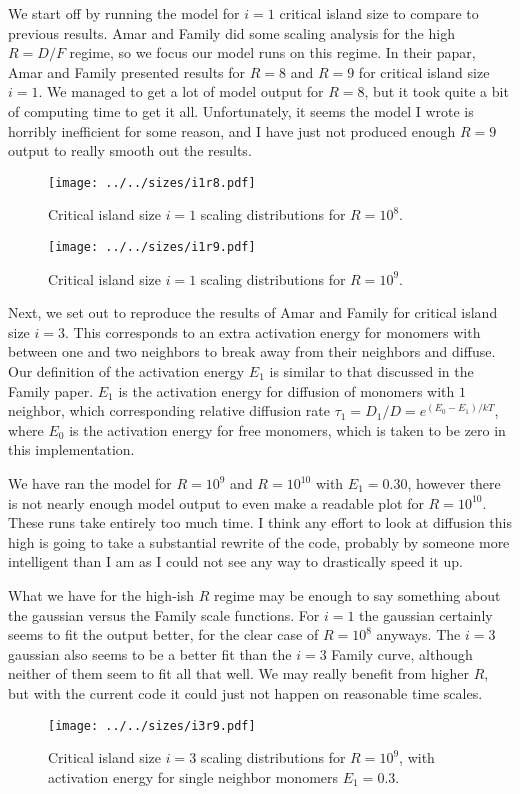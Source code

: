 \documentclass[12pt]{article}
\begin{document}
We start off by running the model for $i = 1$ critical island size to compare to previous results. Amar and Family did some scaling analysis for the high $R = D/F$ regime, so we focus our model runs on this regime. In their papar, Amar and Family presented results for $R = 8$ and $R = 9$ for critical island size $i = 1$. We managed to get a lot of model output for $R = 8$, but it took quite a bit of computing time to get it all. Unfortunately, it seems the model I wrote is horribly inefficient for some reason, and I have just not produced enough $R = 9$ output to really smooth out the results.


\begin{figure}
\begin{center}
\texttt{[image: ../../sizes/i1r8.pdf]} \\
\end{center}
\caption{Critical island size $i = 1$ scaling distributions for $R = 10^8$.}
\end{figure}

\begin{figure}
\begin{center}
\texttt{[image: ../../sizes/i1r9.pdf]}
\end{center}
\caption{Critical island size $i = 1$ scaling distributions for $R = 10^9$.}
\end{figure}

Next, we set out to reproduce the results of Amar and Family for critical island size $i = 3$. This corresponds to an extra activation energy for monomers with between one and two neighbors to break away from their neighbors and diffuse. Our definition of the activation energy $E_1$ is similar to that discussed in the Family paper. $E_1$ is the activation energy for diffusion of monomers with $1$ neighbor, which corresponding relative diffusion rate $\tau_1 = D_1/D = e^{(E_0 - E_1)/kT}$, where $E_0$ is the activation energy for free monomers, which is taken to be zero in this implementation.

We have ran the model for $R = 10^9$ and $R = 10^{10}$ with $E_1 = 0.30$, however there is not nearly enough model output to even make a readable plot for $R = 10^{10}$. These runs take entirely too much time. I think any effort to look at diffusion this high is going to take a substantial rewrite of the code, probably by someone more intelligent than I am as I could not see any way to drastically speed it up.

What we have for the high-ish $R$ regime may be enough to say something about the gaussian versus the Family scale functions. For $i = 1$ the gaussian certainly seems to fit the output better, for the clear case of $R = 10^8$ anyways. The $i = 3$ gaussian also seems to be a better fit than the $i = 3$ Family curve, although neither of them seem to fit all that well. We may really benefit from higher $R$, but with the current code it could just not happen on reasonable time scales.

\begin{figure}
\begin{center}
\texttt{[image: ../../sizes/i3r9.pdf]}
\caption{Critical island size $i = 3$ scaling distributions for $R = 10^9$, with activation energy for single neighbor monomers $E_1 = 0.3$.}
\end{center}
\end{figure}
\end{document}

